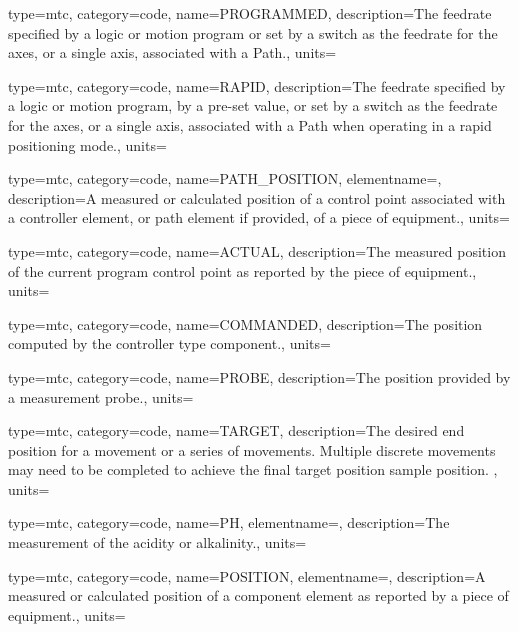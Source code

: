 {
  type=mtc,
  category=code,
  name={PROGRAMMED},
  description={The feedrate specified by a logic or motion program or set by a switch as the feedrate for the axes, or a single axis, associated with a Path.},
  units=
}

{
  type=mtc,
  category=code,
  name={RAPID},
  description={The feedrate specified by a logic or motion program, by a pre-set value, or set by a switch as the feedrate for the axes, or a single axis, associated with a Path when operating in a rapid positioning mode.},
  units=
}

{
  type=mtc,
  category=code,
  name={PATH\_POSITION},
  elementname=,
  description={A measured or calculated position of a control point associated with a \gls{controller} element, or \gls{path} element if provided, of a piece of equipment.},
  units=
}

{
  type=mtc,
  category=code,
  name={ACTUAL},
  description={The measured position of the current program control point as reported by the piece of equipment.},
  units=
}

{
  type=mtc,
  category=code,
  name={COMMANDED},
  description={The position computed by the \gls{controller} type component.},
  units=
}

{
  type=mtc,
  category=code,
  name={PROBE},
  description={The position provided by a measurement probe.},
  units=
}

{
  type=mtc,
  category=code,
  name={TARGET},
  description={The desired end position for a movement or a series of movements. Multiple discrete movements may need to be completed to achieve the final \gls{target position sample} position.  },
  units=
}

{
  type=mtc,
  category=code,
  name={PH},
  elementname=,
  description={The measurement of the acidity or alkalinity.},
  units=
}

{
  type=mtc,
  category=code,
  name={POSITION},
  elementname=,
  description={A measured or calculated position of a \gls{component} element as reported by a piece of equipment.},
  units=
}

